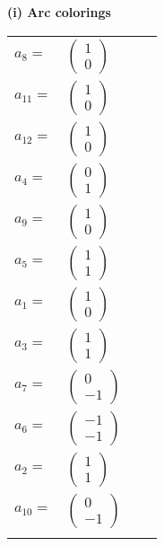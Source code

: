 \documentclass[1p]{elsarticle_modified}
\theoremstyle{definition}
\begin{document}
\flushleft \textbf{(i) Arc colorings}\\
\begin{tabular}{m{7pt} m{180pt} m{7pt} m{180pt} }
\flushright $a_{8}=$&$\begin{pmatrix}1\\0\end{pmatrix}$ \\
\flushright $a_{11}=$&$\begin{pmatrix}1\\0\end{pmatrix}$ \\
\flushright $a_{12}=$&$\begin{pmatrix}1\\0\end{pmatrix}$ \\
\flushright $a_{4}=$&$\begin{pmatrix}0\\1\end{pmatrix}$ \\
\flushright $a_{9}=$&$\begin{pmatrix}1\\0\end{pmatrix}$ \\
\flushright $a_{5}=$&$\begin{pmatrix}1\\1\end{pmatrix}$ \\
\flushright $a_{1}=$&$\begin{pmatrix}1\\0\end{pmatrix}$ \\
\flushright $a_{3}=$&$\begin{pmatrix}1\\1\end{pmatrix}$ \\
\flushright $a_{7}=$&$\begin{pmatrix}0\\-1\end{pmatrix}$ \\
\flushright $a_{6}=$&$\begin{pmatrix}-1\\-1\end{pmatrix}$ \\
\flushright $a_{2}=$&$\begin{pmatrix}1\\1\end{pmatrix}$ \\
\flushright $a_{10}=$&$\begin{pmatrix}0\\-1\end{pmatrix}$\\&\end{tabular}
\end{document}
